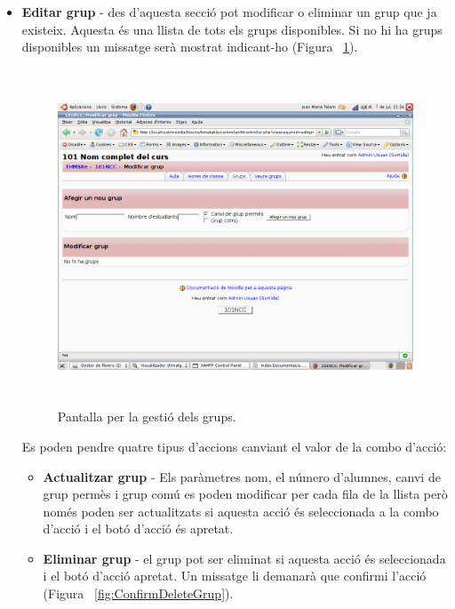 \documentclass[a4paper]{report}  %
\begin{document}
\begin{itemize}
\item\textbf{Editar grup} - des d'aquesta secció pot modificar o eliminar un grup que ja existeix.
Aquesta és una llista de tots els grups disponibles. Si no hi ha grups disponibles un missatge serà mostrat indicant-ho (Figura ~\ref{fig:EditantGrup}).
		\begin{figure}[H] %
		\begin{center}
		\includegraphics[height=10cm,width=12cm]{img/EditantGrup.png}
		\caption[List caption]{Pantalla per la gestió dels grups.}
		\label{fig:EditantGrup}
		\end{center}
		\end{figure}
Es poden pendre quatre tipus d'accions canviant el valor de la combo d'acció:
	\begin{itemize}
	\item\textbf{Actualitzar grup} - Els paràmetres nom, el número d'alumnes, canvi de grup permès i grup comú es poden modificar per cada fila de la llista però només poden ser actualitzats si aquesta acció és seleccionada a la combo d'acció i el botó d'acció és apretat.
	\item\textbf{Eliminar grup} - el grup pot ser eliminat si aquesta acció és seleccionada i el botó d'acció apretat. Un missatge li demanarà que confirmi l'acció (Figura ~\ref{fig:ConfirmDeleteGrup}).
		\begin{figure}[H] %
		\begin{center}

\end{center}
\end{figure}
\end{itemize}
\end{itemize}
\end{document}
